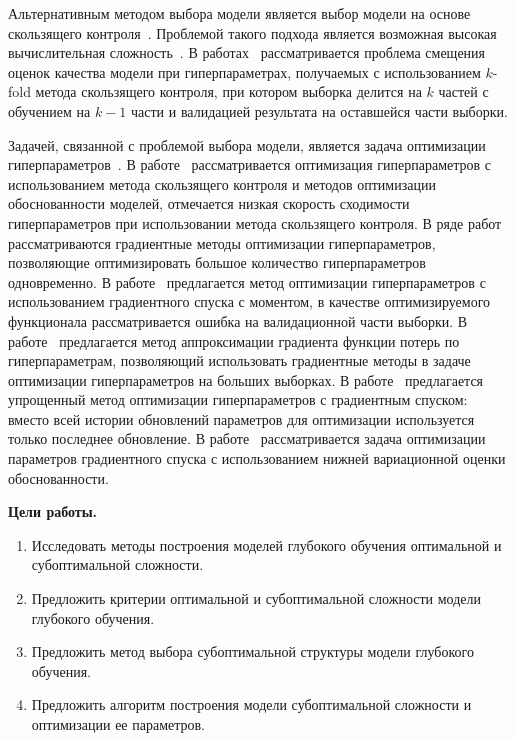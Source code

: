 Альтернативным методом выбора модели является выбор модели на основе скользящего контроля~\cite{cv_ms, tokmakova}. Проблемой такого подхода является возможная высокая вычислительная сложность~\cite{expensive, expensive2}. В работах~\cite{bias,bias2} рассматривается проблема смещения оценок качества модели при гиперпараметрах, получаемых с использованием $k$-fold метода скользящего контроля, при котором выборка делится на $k$ частей с обучением на $k-1$ части и валидацией результата на оставшейся части выборки. 

Задачей, связанной с проблемой выбора модели, является задача оптимизации гиперпараметров~\cite{mackay,bishop}. В работе~\cite{tokmakova} рассматривается оптимизация гиперпараметров с использованием метода скользящего контроля и методов оптимизации обоснованности моделей, отмечается низкая скорость сходимости гиперпараметров при использовании метода скользящего контроля. В ряде работ~\cite{hyper, hyper2} рассматриваются градиентные методы оптимизации гиперпараметров, позволяющие оптимизировать большое количество гиперпараметров одновременно. В работе~\cite{hyper} предлагается метод оптимизации гиперпараметров с использованием градиентного спуска с моментом, в качестве оптимизируемого функционала рассматривается ошибка на валидационной части выборки. В работе~\cite{approx_hyper} предлагается метод аппроксимации градиента функции потерь по гиперпараметрам, позволяющий использовать градиентные методы в задаче оптимизации гиперпараметров на больших выборках. В работе~\cite{greed_hyper} предлагается упрощенный метод оптимизации гиперпараметров с градиентным спуском: вместо всей истории обновлений параметров для оптимизации используется только последнее обновление. В работе~\cite{sgd_cont} рассматривается задача оптимизации параметров градиентного спуска с использованием нижней вариационной оценки обоснованности. 


\vspace{0.5cm}
\textbf{Цели работы.}
\vspace{0.2cm}
\begin{enumerate}
\item Исследовать методы построения моделей глубокого обучения оптимальной и субоптимальной сложности.
\item Предложить критерии оптимальной и субоптимальной сложности модели глубокого обучения.
\item Предложить метод выбора субоптимальной структуры модели глубокого обучения.
\item Предложить алгоритм построения модели субоптимальной сложности и оптимизации ее параметров.
\end{enumerate}


